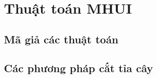 \section{Thuật toán MHUI}

\subsection{Mã giả các thuật toán}



\subsection{Các phương pháp cắt tỉa cây}





















